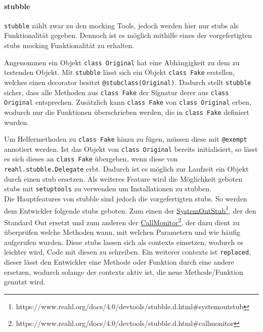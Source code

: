 \paragraph{stubble}\label{python-tools:stubble}\mbox{}
\newline
\lstinline{stubble} zählt zwar zu den \gls{mock}ing Tools, jedoch werden hier
nur \Glspl{stub} als Funktionalität gegeben. Dennoch ist es möglich mithilfe 
eines der vorgefertigten \Glspl{stub} \gls{mock}ing Funktionalität zu erhalten.
\newline

Angenommen ein Objekt \lstinline{class Original} hat eine Abhängigkeit zu dem zu
testenden Objekt. Mit \lstinline{stubble} lässt sich ein Objekt
\lstinline{class Fake} erstellen, welches einen \gls{decorator} besitzt
\lstinline{@stubclass(Original)}. Dadurch stellt \lstinline{stubble} sicher,
dass alle Methoden aus \lstinline{class Fake} der Signatur derer aus
\lstinline{class Original} entsprechen. Zusätzlich kann \lstinline{class Fake}
von \lstinline{class Original} erben, wodurch nur die Funktionen überschrieben
werden, die in \lstinline{class Fake} definiert wurden.

Um Helfermethoden zu \lstinline{class Fake} hinzu zu fügen, müssen diese mit
\lstinline{@exempt} annotiert werden. Ist das Objekt von
\lstinline{class Original} bereits initialisiert, so lässt es sich dieses an
\lstinline{class Fake} übergeben, wenn diese von
\lstinline{reahl.stubble.Delegate} erbt. Dadurch ist es möglich zur Laufzeit
ein Objekt durch einen \Gls{stub} ersetzen. Als weiteres Feature wird die
Möglichkeit geboten \Glspl{stub} mit \lstinline{setuptools} zu verwenden um
Installationen zu \gls{stub}ben.
\newline
\\
Die Hauptfeatures von stubble sind jedoch die vorgefertigten \Glspl{stub}. So
werden dem Entwickler folgende \Glspl{stub} geboten:
Zum einen der
\href{https://www.reahl.org/docs/4.0/devtools/stubble.d.html\#systemoutstub}{SystemOutStub}\footnote{https://www.reahl.org/docs/4.0/devtools/stubble.d.html\#systemoutstub},
der den Standard Out ersetzt und zum anderen der
\href{https://www.reahl.org/docs/4.0/devtools/stubble.d.html\#callmonitor}{CallMonitor}\footnote{https://www.reahl.org/docs/4.0/devtools/stubble.d.html\#callmonitor},
der dazu dient zu überprüfen welche Methoden wann, mit welchen Parametern und
wie häufig aufgerufen wurden.
Diese \Glspl{stub} lassen sich als \glspl{context} einsetzen, wodurch es
leichter wird, Code mit diesen zu schreiben. Ein weiterer \Glspl{context} ist
\lstinline{replaced}, dieser lässt den Entwickler eine Methode oder Funktion
durch eine andere ersetzen, wodurch solange der \glspl{context} aktiv ist, die
neue Methode/Funktion genutzt wird.
\newline

